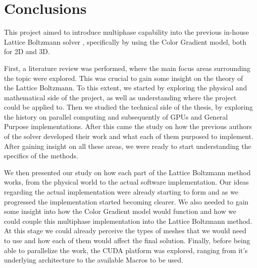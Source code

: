 \documentclass[12pt]{book}
\begin{document}
\chapter{Conclusions}
This project aimed to introduce multiphase capability into the previous in-house Lattice Boltzmann solver \cite{maciej_thesis,koleszar_thesis,jozsa_thesis,szoke_thesis}, specifically by using the Color Gradient model, both for 2D and 3D. \par
First, a literature review was performed, where the main focus areas surrounding the topic were explored. This was crucial to gain some insight on the theory of the Lattice Boltzmann. To this extent, we started by exploring the physical and mathematical side of the project, as well as understanding where the project could be applied to. Then we studied the technical side of the thesis, by exploring the history on parallel computing and subsequently of GPUs and General Purpose implementations. After this came the study on how the previous authors of the solver developed their work and what each of them purposed to implement. After gaining insight on all these areas, we were ready to start understanding the specifics of the methods. \par
We then presented our study on how each part of the Lattice Boltzmann method works, from the physical world to the actual software implementation. Our ideas regarding the actual implementation were already starting to form and as we progressed the implementation started becoming clearer. We also needed to gain some insight into how the Color Gradient model would function and how we could couple this multiphase implementation into the Lattice Boltzmann method. At this stage we could already perceive the types of meshes that we would need to use and how each of them would affect the final solution. Finally, before being able to parallelize the work, the CUDA platform was explored, ranging from it's underlying architecture to the available Macros to be used. \par
\end{document}
